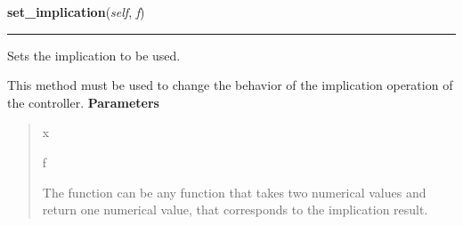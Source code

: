 \hspace{.8\funcindent}\begin{boxedminipage}{\funcwidth}

    \raggedright \textbf{set\_implication}(\textit{self}, \textit{f})

    \vspace{-1.5ex}

    \rule{\textwidth}{0.5\fboxrule}
\setlength{\parskip}{2ex}

Sets the implication to be used.

This method must be used to change the behavior of the implication
operation of the controller.
\setlength{\parskip}{1ex}
      \textbf{Parameters}
      \vspace{-1ex}

      \begin{quote}
        \begin{Ventry}{x}

          \item[f]


The function can be any function that takes two numerical values and
return one numerical value, that corresponds to the implication
result.
        \end{Ventry}

      \end{quote}

    \end{boxedminipage}

    \label{peach:fuzzy:control:Controller:set_aglutination}

    \vspace{0.5ex}

